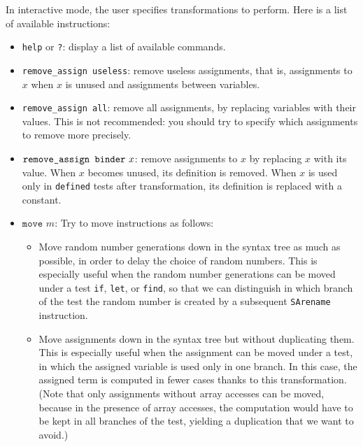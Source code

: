 \documentclass{article}
\begin{document}
In interactive mode, the user specifies transformations to perform.
Here is a list of available instructions:
\begin{itemize}

\item \texttt{help} or \texttt{?}: display a list of available commands.

\item \texttt{remove\string_assign useless}: remove useless assignments,
that is, assignments to $x$ when $x$ is unused and assignments
between variables.

\item \texttt{remove\string_assign all}: remove all assignments,
by replacing variables with their values. This is not recommended:
you should try to specify which assignments to remove more precisely.

\item $\texttt{remove\string_assign binder}\ x$: remove assignments
to $x$ by replacing $x$ with its value. When $x$ becomes unused,
its definition is removed. When $x$ is used only in \texttt{defined} 
tests after transformation, its definition is replaced with 
a constant.

\item $\texttt{move }m$: Try to move instructions as follows:
\begin{itemize}

\item Move random number generations down in the syntax tree as much
  as possible, in order to delay the choice of random numbers. This is
  especially useful when the random number generations can be moved
  under a test {\tt if}, {\tt let}, or {\tt find}, so that we can
  distinguish in which branch of the test the random number is created
  by a subsequent \texttt{SArename} instruction.

\item Move assignments down in the syntax tree but without duplicating
  them. This is especially useful when the assignment can be moved
  under a test, in which the assigned variable is used only in one
  branch. In this case, the assigned term is computed in fewer cases
  thanks to this transformation.
  (Note that only assignments without array accesses can be moved,
  because in the presence of array accesses, the computation would have
  to be kept in all branches of the test, yielding a duplication that 
  we want to avoid.)


\end{itemize}
\end{itemize}
\end{document}
